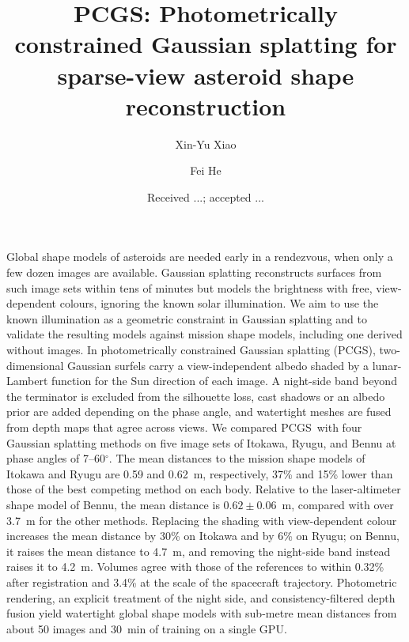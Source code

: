 \documentclass[fleqn,usenatbib]{aa}
\newcommand{\pcgs}{PCGS}
\begin{document}
\title{PCGS: Photometrically constrained Gaussian splatting for sparse-view asteroid shape reconstruction}


\author{Xin-Yu Xiao
        \and Fei He}


\date{Received ...; accepted ...}

\abstract
{Global shape models of asteroids are needed early in a rendezvous, when only a few dozen images are available.
Gaussian splatting reconstructs surfaces from such image sets within tens of minutes but models the brightness with
free, view-dependent colours, ignoring the known solar illumination.}
{We aim to use the known illumination as a geometric constraint in Gaussian splatting and to validate the resulting
models against mission shape models, including one derived without images.}
{In photometrically constrained Gaussian splatting (\pcgs), two-dimensional Gaussian surfels carry a view-independent
albedo shaded by a lunar-Lambert function for the Sun direction of each image. A night-side band beyond the
terminator is excluded from the silhouette loss, cast shadows or an albedo prior are added depending on the phase
angle, and watertight meshes are fused from depth maps that agree across views. We compared \pcgs\ with four Gaussian
splatting methods on five image sets of Itokawa, Ryugu, and Bennu at phase angles of 7--60$^\circ$.}
{The mean distances to the mission shape models of Itokawa and Ryugu are 0.59 and 0.62~m, respectively, 37\% and
15\% lower than those of the best competing method on each body. Relative to the laser-altimeter shape model of
Bennu, the mean distance is $0.62\pm0.06$~m, compared with over 3.7~m for the other methods. Replacing the shading
with view-dependent colour increases the mean distance by 30\% on Itokawa and by 6\% on Ryugu; on Bennu, it raises the
mean distance to 4.7~m, and removing the night-side band instead raises it to 4.2~m. Volumes agree with those of the
references to within 0.32\% after registration and 3.4\% at the scale of the spacecraft trajectory.}
{Photometric rendering, an explicit treatment of the night side, and consistency-filtered depth fusion yield
watertight global shape models with sub-metre mean distances from about 50 images and 30~min of training on a
single GPU.}
\end{document}
